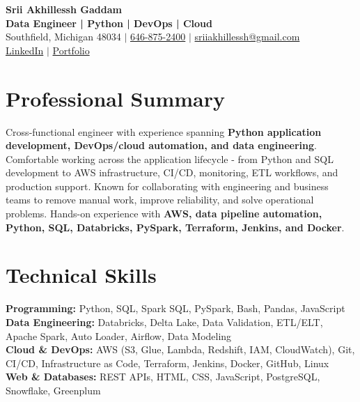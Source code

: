 \documentclass[letterpaper,10pt]{article}
\begin{document}
\fontsize{9.35pt}{10.45pt}\selectfont

\begin{center}
    {\LARGE \textbf{Srii Akhillessh Gaddam}} \\[-1pt]
    \textbf{Data Engineer | Python | DevOps | Cloud} \\[2pt]
    Southfield, Michigan 48034 $|$
    \href{tel:6468752400}{646-875-2400} $|$
    \href{mailto:sriiakhillessh@gmail.com}{sriiakhillessh@gmail.com} \\[1pt]
    \href{https://www.linkedin.com/in/srii-akhiilessh-gaddam-b48668191/}{LinkedIn} $|$
    \href{https://sriiakhillesshg.github.io/portfolio/}{Portfolio}
\end{center}
\vspace{-8pt}

\section{Professional Summary}
\small{Cross-functional engineer with experience spanning \textbf{Python application development, DevOps/cloud automation, and data engineering}. Comfortable working across the application lifecycle - from Python and SQL development to AWS infrastructure, CI/CD, monitoring, ETL workflows, and production support. Known for collaborating with engineering and business teams to remove manual work, improve reliability, and solve operational problems. Hands-on experience with \textbf{AWS, data pipeline automation, Python, SQL, Databricks, PySpark, Terraform, Jenkins, and Docker}.}

\section{Technical Skills}
\small{
\textbf{Programming:} Python, SQL, Spark SQL, PySpark, Bash, Pandas, JavaScript \\
\textbf{Data Engineering:} Databricks, Delta Lake, Data Validation, ETL/ELT, Apache Spark, Auto Loader, Airflow, Data Modeling \\
\textbf{Cloud \& DevOps:} AWS (S3, Glue, Lambda, Redshift, IAM, CloudWatch), Git, CI/CD, Infrastructure as Code, Terraform, Jenkins, Docker, GitHub, Linux \\
\textbf{Web \& Databases:} REST APIs, HTML, CSS, JavaScript, PostgreSQL, Snowflake, Greenplum
}
\end{document}

